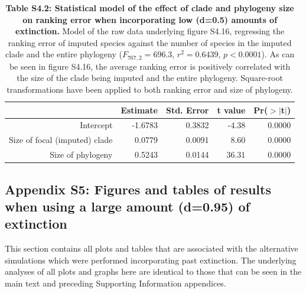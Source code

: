 \documentclass[10pt,english]{article}
\begin{document}
\begin{table}[ht]
  \centering
  \begin{tabular}{rrrrr}
    \hline
   & Estimate & Std. Error & t value & Pr($>$$|$t$|$) \\ \hline
   Intercept & -1.6783 & 0.3832 & -4.38 & 0.0000 \\
   Size of focal (imputed) clade & 0.0779 & 0.0091 & 8.60 & 0.0000 \\
   Size of phylogeny & 0.5243 & 0.0144 & 36.31 & 0.0000 \\ \hline
  \end{tabular}
  \caption{\textbf{Table S4.2: Statistical model of the effect of clade and
      phylogeny size on ranking error when incorporating low (d=0.5) amounts of
      extinction.} Model of the raw data underlying figure S4.16, regressing the
      ranking error of imputed species against the number of species in the
      imputed clade and the entire phylogeny ($F_{767,2} = 696.3$, $r^2 =
      0.6439$, $p < 0.0001$). As can be seen in figure S4.16, the average
      ranking error is positively correlated with the size of the clade being
      imputed and the entire phylogeny. Square-root transformations have been
      applied to both ranking error and size of phylogeny.}
\end{table}

\clearpage
\subsection*{Appendix S5: Figures and tables of results when using a large amount (d=0.95) of extinction}

This section contains all plots and tables that are associated with the
alternative simulations which were performed incorporating past extinction. The
underlying analyses of all plots and graphs here are identical to those that can
be seen in the main text and preceding Supporting Information appendices.
\end{document}
